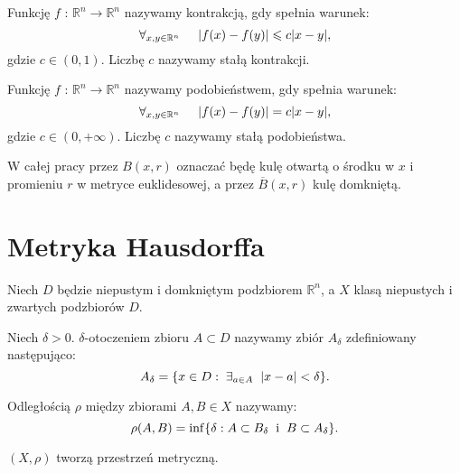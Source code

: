 \documentclass{mini}
\begin{document}
\begin{df}
Funkcję $f$ : $\mathbb{R}^n\longrightarrow\mathbb{R}^n$ nazywamy kontrakcją, gdy spełnia warunek:
$$
\forall_{x,y \in \mathbb{R}^n} \hspace{5mm} |f(x)-f(y)| \leqslant c|x-y|,
$$
gdzie $c \in (0,1)$. Liczbę $c$ nazywamy stałą kontrakcji.
\end{df}

\begin{df}
Funkcję $f$ : $\mathbb{R}^n\longrightarrow\mathbb{R}^n$ nazywamy podobieństwem, gdy spełnia warunek:
$$
\forall_{x,y \in \mathbb{R}^n} \hspace{5mm} |f(x)-f(y)|=c|x-y|,
$$
gdzie $c \in (0,+\infty)$. Liczbę $c$ nazywamy stałą podobieństwa.
\end{df}

W całej pracy przez $B(x,r)$ oznaczać będę kulę otwartą o środku w $x$ i promieniu $r$ w metryce euklidesowej, a przez $\overline{B}(x,r)$ kulę domkniętą.

\section{Metryka Hausdorffa}

Niech $D$ będzie niepustym i domkniętym podzbiorem $\mathbb{R}^n$, a $X$ klasą niepustych i zwartych podzbiorów $D$. 

\begin{df}
Niech $\delta > 0$. $\delta$-otoczeniem zbioru $A \subset D$ nazywamy zbiór $A_{\delta}$ 			zdefiniowany następująco:
$$ 
A_{\delta}= \lbrace x \in D: \hspace{1mm} \exists_{a \in A} \hspace{2mm} |x-a| < \delta \rbrace. 
$$
\end{df}

\begin{df}
Odległością $\rho$ między zbiorami $ A,B \in X $ nazywamy:
$$ 
\rho(A,B) = \inf \lbrace \delta: A \subset B_{\delta} \hspace{2mm} \textrm{i} \hspace{2mm} B \subset A_{\delta} \rbrace. 
$$  
\end{df}

\begin{tw}
$(X,\rho)$ tworzą przestrzeń metryczną. 
\end{tw}
\end{document}

